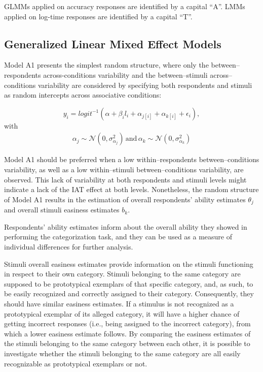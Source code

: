 \documentclass{book}
\begin{document}
GLMMs applied on accuracy responses are identified by a capital ``A''. LMMs applied on log-time responses are identified by a capital ``T''. 


\subsection[GLMMs]{Generalized Linear Mixed Effect Models}

Model A1 presents the simplest random structure, where only the between--respondents across-conditions variability and the between--stimuli across--conditions variability are considered by specifying both respondents and stimuli as random intercepts across associative conditions: 

\begin{equation}\label{AccuracyMin}
	y_{i} = logit^{-1}(\alpha + \beta_il_i + \alpha_{j[i]} +  \alpha_{k[i]} + \epsilon_{i}),
\end{equation}
with
\begin{align}
	\alpha_{j} \sim  \mathcal{N} ( 0, \sigma_{\alpha_j}^2) \, \text{and} \, \alpha_{k}  \sim  \mathcal{N} (0,\sigma_{\alpha_k}^2)
\end{align}

Model A1 should be preferred when a low within--respondents between--conditions variability, as well as a low within--stimuli between--conditions variability, are observed. This lack of variability at both respondents and stimuli levels might indicate a lack of the IAT effect at both levels. 
Nonetheless, the random structure of Model A1 results in the estimation of overall respondents' ability estimates $\theta_{j}$ and overall stimuli easiness estimates $b_k$. 

Respondents' ability estimates inform about the overall ability they showed in performing the categorization task, and they can be used as a measure of individual differences for further analysis. 

Stimuli overall easiness estimates provide information on the stimuli functioning in respect to their own category. Stimuli belonging to the same category are supposed to be prototypical exemplars of that specific category, and, as such, to be easily recognized and correctly assigned to their category. Consequently, they should have similar easiness estimates.
If a stimulus is not recognized as a prototypical exemplar of its alleged category, it will have a higher chance of getting incorrect responses (i.e., being assigned to the incorrect category), from which a lower easiness estimate follows. By comparing the easiness estimates of the stimuli belonging to the same category between each other, it is possible to investigate whether the stimuli belonging to the same category are all easily recognizable as prototypical exemplars or not.
\end{document}
